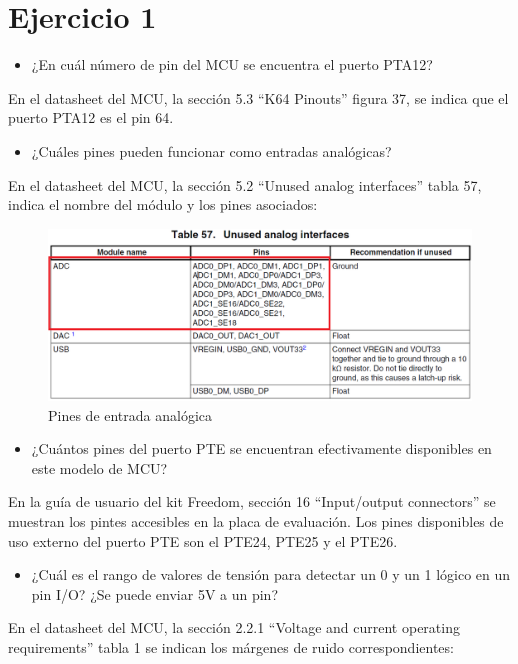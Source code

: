 \documentclass{article}
\begin{document}
\newgeometry{} %



\tableofcontents
\newpage

\section*{Ejercicio 1}

\begin{itemize}
\item ¿En cuál número de pin del MCU se encuentra el puerto PTA12?
\end{itemize}
En el datasheet del MCU, la sección 5.3 ``K64 Pinouts'' figura 37, se indica que el puerto PTA12 es el pin 64.

\begin{itemize}
\item ¿Cuáles pines pueden funcionar como entradas analógicas?
\end{itemize}
En el datasheet del MCU, la sección 5.2 ``Unused analog interfaces'' tabla 57, indica el nombre del módulo y los pines asociados:

\begin{figure}[ht]
	\centering
	\includegraphics[width=0.8 \textwidth]
	{../Imagenes/TablaADC.png}
	\caption{Pines de entrada analógica}
	\label{fig:ej1}
\end{figure}

\begin{itemize}
\item ¿Cuántos pines del puerto PTE se encuentran efectivamente disponibles en este modelo de MCU?
\end{itemize}
En la guía de usuario del kit Freedom, sección 16 ``Input/output connectors'' se muestran los pintes accesibles en la placa de evaluación. Los pines disponibles de uso externo del puerto PTE son el PTE24, PTE25 y el PTE26.

\begin{itemize}
\item ¿Cuál es el rango de valores de tensión para detectar un 0 y un 1 lógico en un pin I/O? ¿Se puede enviar 5V a un pin?
\end{itemize}
En el datasheet del MCU, la sección 2.2.1 ``Voltage and current operating requirements'' tabla 1 se indican los márgenes de ruido correspondientes:
\end{document}

